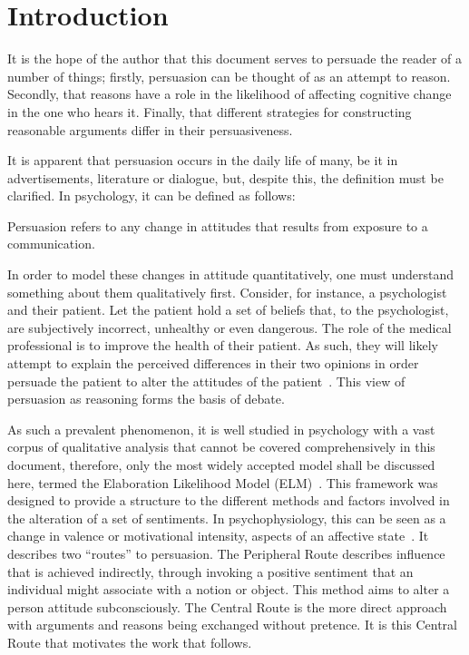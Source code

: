 \newpage

\section{Introduction}

It is the hope of the author that this document serves to persuade the reader of a number of things; firstly, persuasion can be thought of as an attempt to reason. Secondly, that reasons have a role in the likelihood of affecting cognitive change in the one who hears it. Finally, that different strategies for constructing reasonable arguments differ in their persuasiveness. 

It is apparent that persuasion occurs in the daily life of many, be it in advertisements, literature or dialogue, but, despite this, the definition must be clarified. In psychology, it can be defined as follows:

\begin{displayquote}
    Persuasion refers to any change in attitudes that results from exposure to a communication. ~\cite{Petty1986CommunicationChange}
\end{displayquote}


In order to model these changes in attitude quantitatively, one must understand something about them qualitatively first. Consider, for instance, a psychologist and their patient. Let the patient hold a set of beliefs that, to the psychologist, are subjectively incorrect, unhealthy or even dangerous. The role of the medical professional is to improve the health of their patient. As such, they will likely attempt to explain the perceived differences in their two opinions in order persuade the patient to alter the attitudes of the patient~\cite{Petty1997ThePsychology}. This view of persuasion as reasoning forms the basis of debate.

As such a prevalent phenomenon, it is well studied in psychology with a vast corpus of qualitative analysis that cannot be covered comprehensively in this document, therefore, only the most widely accepted model shall be discussed here, termed the Elaboration Likelihood Model (ELM)~\cite{Petty1997ThePsychology}. This framework was designed to provide a structure to the different methods and factors involved in the alteration of a set of sentiments. In psychophysiology, this can be seen as a change in valence or motivational intensity, aspects of an affective state~\cite{Harmon-Jones2013DoesScope}. It describes two ``routes'' to persuasion. The Peripheral Route describes influence that is achieved indirectly, through invoking a positive sentiment that an individual might associate with a notion or object. This method aims to alter a person attitude subconsciously. The Central Route is the more direct approach with arguments and reasons being exchanged without pretence. It is this Central Route that motivates the work that follows. 

